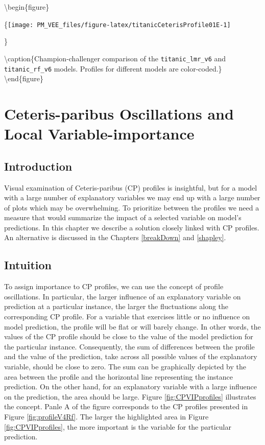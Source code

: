 \documentclass[12pt,]{krantz}
\theoremstyle{definition}
\theoremstyle{definition}
\theoremstyle{definition}
\theoremstyle{remark}
\begin{document}
\textbackslash{}begin\{figure\}

\{\centering \texttt{[image: PM\_VEE\_files/figure-latex/titanicCeterisProfile01E-1]}

\}

\textbackslash{}caption\{Champion-challenger comparison of the
\texttt{titanic\_lmr\_v6} and \texttt{titanic\_rf\_v6} models. Profiles
for different models are color-coded.\}\label{fig:titanicCeterisProfile01E}
\textbackslash{}end\{figure\}

\hypertarget{ceterisParibusOscillations}{%
\section{Ceteris-paribus Oscillations and Local
Variable-importance}\label{ceterisParibusOscillations}}

\hypertarget{CPOscIntro}{%
\subsection{Introduction}\label{CPOscIntro}}

Visual examination of Ceteris-paribus (CP) profiles is insightful, but
for a model with a large number of explanatory variables we may end up
with a large number of plots which may be overwhelming. To prioritize
between the profiles we need a measure that would summarize the impact
of a selected variable on model's predictions. In this chapter we
describe a solution closely linked with CP profiles. An alternative is
discussed in the Chapters \ref{breakDown} and \ref{shapley}.

\hypertarget{CPOscIntuition}{%
\subsection{Intuition}\label{CPOscIntuition}}

To assign importance to CP profiles, we can use the concept of profile
oscillations. In particular, the larger influence of an explanatory
variable on prediction at a particular instance, the larger the
fluctuations along the corresponding CP profile. For a variable that
exercises little or no influence on model prediction, the profile will
be flat or will barely change. In other words, the values of the CP
profile should be close to the value of the model prediction for the
particular instance. Consequently, the sum of differences between the
profile and the value of the prediction, take across all possible values
of the explanatory variable, should be close to zero. The sum can be
graphically depicted by the area between the profile and the horizontal
line representing the instance prediction. On the other hand, for an
explanatory variable with a large influence on the prediction, the area
should be large. Figure \ref{fig:CPVIPprofiles} illustrates the concept.
Panle A of the figure corresponds to the CP profiles presented in Figure
\ref{fig:profileV4Rf}. The larger the highlighted area in Figure
\ref{fig:CPVIPprofiles}, the more important is the variable for the
particular prediction.
\end{document}
